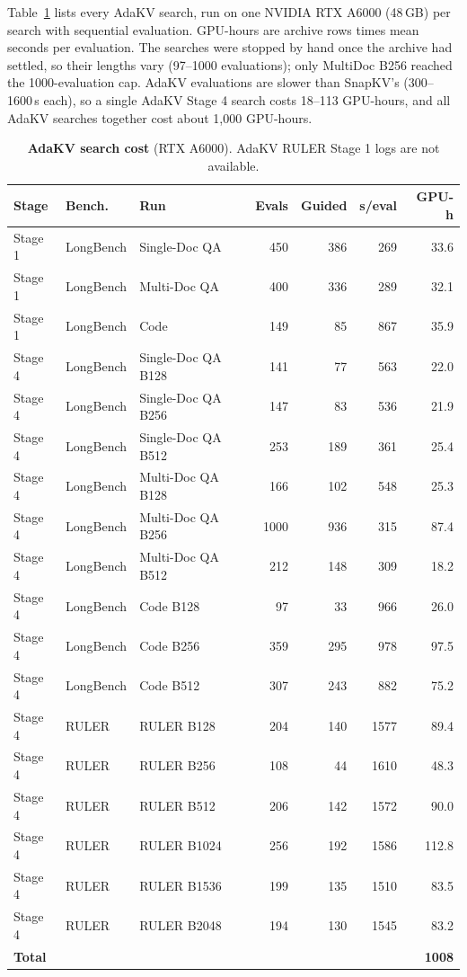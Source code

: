 Table~\ref{tab:app-cost-adakv} lists every AdaKV search, run on one NVIDIA RTX A6000 (48\,GB) per search with sequential evaluation. GPU-hours are archive rows times mean seconds per evaluation. The searches were stopped by hand once the archive had settled, so their lengths vary (97--1000 evaluations); only MultiDoc B256 reached the 1000-evaluation cap. AdaKV evaluations are slower than SnapKV's (300--1600\,s each), so a single AdaKV Stage 4 search costs 18--113 GPU-hours, and all AdaKV searches together cost about 1{,}000 GPU-hours.

\begin{table}[t]
  \centering
  \scriptsize
  \setlength{\tabcolsep}{2.5pt}
  \begin{tabular}{@{}l l l r r r r@{}}
    \toprule
    Stage & Bench. & Run & Evals & Guided & s/eval & GPU-h \\
    \midrule
    Stage 1 & LongBench & Single-Doc QA & 450 & 386 & 269 & 33.6 \\
    Stage 1 & LongBench & Multi-Doc QA & 400 & 336 & 289 & 32.1 \\
    Stage 1 & LongBench & Code & 149 & 85 & 867 & 35.9 \\
    Stage 4 & LongBench & Single-Doc QA B128 & 141 & 77 & 563 & 22.0 \\
    Stage 4 & LongBench & Single-Doc QA B256 & 147 & 83 & 536 & 21.9 \\
    Stage 4 & LongBench & Single-Doc QA B512 & 253 & 189 & 361 & 25.4 \\
    Stage 4 & LongBench & Multi-Doc QA B128 & 166 & 102 & 548 & 25.3 \\
    Stage 4 & LongBench & Multi-Doc QA B256 & 1000 & 936 & 315 & 87.4 \\
    Stage 4 & LongBench & Multi-Doc QA B512 & 212 & 148 & 309 & 18.2 \\
    Stage 4 & LongBench & Code B128 & 97 & 33 & 966 & 26.0 \\
    Stage 4 & LongBench & Code B256 & 359 & 295 & 978 & 97.5 \\
    Stage 4 & LongBench & Code B512 & 307 & 243 & 882 & 75.2 \\
    Stage 4 & RULER & RULER B128 & 204 & 140 & 1577 & 89.4 \\
    Stage 4 & RULER & RULER B256 & 108 & 44 & 1610 & 48.3 \\
    Stage 4 & RULER & RULER B512 & 206 & 142 & 1572 & 90.0 \\
    Stage 4 & RULER & RULER B1024 & 256 & 192 & 1586 & 112.8 \\
    Stage 4 & RULER & RULER B1536 & 199 & 135 & 1510 & 83.5 \\
    Stage 4 & RULER & RULER B2048 & 194 & 130 & 1545 & 83.2 \\
    \textbf{Total} &  &  &  &  &  & \textbf{1008} \\
    \bottomrule
  \end{tabular}
  \caption{\textbf{AdaKV search cost} (RTX A6000). AdaKV RULER Stage 1 logs are not available.}
  \label{tab:app-cost-adakv}
\end{table}


